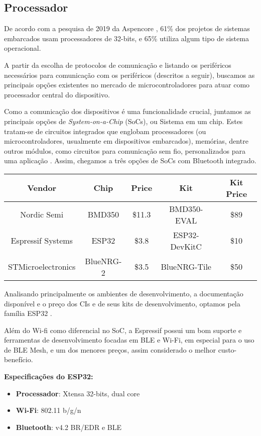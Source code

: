 \documentclass[../monografia.tex]{subfiles}
\begin{document}
\subsection{Processador}

De acordo com a pesquisa de 2019 da Aspencore \cite{eetimes}, 61\% dos projetos de sistemas embarcados usam processadores de 32-bits, e 65\% utiliza algum tipo de sistema operacional. 

A partir da escolha de protocolos de comunicação e listando os periféricos necessários para comunicação com os periféricos (descritos a seguir), buscamos as principais opções existentes no mercado de microcontroladores para atuar como processador central do dispositivo. 

Como a comunicação dos dispositivos é uma funcionalidade crucial, juntamos as principais opções de \textit{System-on-a-Chip} (SoCs), ou Sistema em um chip. Estes tratam-se de circuitos integrados que englobam processadores (ou microcontroladores, usualmente em dispositivos embarcados), memórias, dentre outros módulos, como circuitos para comunicação sem fio, personalizados para uma aplicação \cite{soc}. Assim, chegamos a três opções de SoCs com Bluetooth integrado. 


\begin{center}
\begin{tabular}{|c|c|c|c|c|} 
\hline
\textbf{Vendor} & \textbf{Chip} & \textbf{Price} & \textbf{Kit} & \textbf{Kit Price} \\
\hline
Nordic Semi & BMD350 & \$11.3 & BMD350-EVAL & \$89 \\ 
Espressif Systems & ESP32 & \$3.8 & ESP32-DevKitC & \$10 \\ 
STMicroelectronics & BlueNRG-2 & \$3.5 & BlueNRG-Tile & \$50 \\ 
\hline
\end{tabular}
\end{center}

Analisando principalmente os ambientes de desenvolvimento, a documentação disponível e o preço dos CIs e de seus kits de desenvolvimento, optamos pela família ESP32 \cite{ESP32}. 

Além do Wi-fi como diferencial no SoC, a Espressif possui um bom suporte e ferramentas de desenvolvimento focadas em BLE e Wi-Fi, em especial para o uso de BLE Mesh, e um dos menores preços, assim considerado o melhor custo-benefício. 

\textbf{Especificações do ESP32:} \cite{ESP-datasheet}
\begin{itemize}
\item \textbf{Processador}: Xtensa 32-bits, dual core
\item \textbf{Wi-Fi}: 802.11 b/g/n
\item \textbf{Bluetooth}: v4.2 BR/EDR e BLE
\end{itemize}
\end{document}
